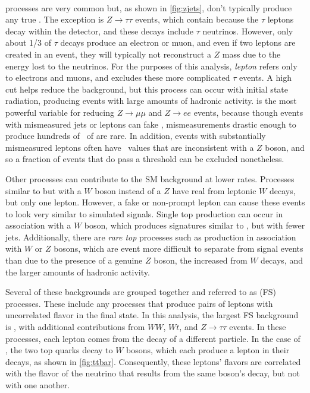 \paragraph{\dyjets} processes are very common but, as shown in \autoref{fig:zjets}, don't typically produce any true \MET. The exception is $Z\rightarrow\tau\tau$ events, which contain \MET because the $\tau$ leptons decay within the detector, and these decays include $\tau$ neutrinos. However, only about 1/3 of $\tau$ decays produce an electron or muon, and even if two leptons are created in an event, they will typically not reconstruct a $Z$ mass due to the energy lost to the neutrinos. For the purposes of this analysis, \textit{lepton} refers only to electrons and muons, and excludes these more complicated $\tau$ events. A high \HT cut helps reduce the \dyjets background, but this process can occur with initial state radiation, producing events with large amounts of hadronic activity. \MET is the most powerful variable for reducing $Z\rightarrow\mu\mu$ and $Z\rightarrow ee$ events, because though events with mismeasured jets or leptons can fake \MET, mismeasurements drastic enough to produce hundreds of \gev~of \met are rare. In addition, events with substantially mismeasured leptons often have \mll~values that are inconsistent with a $Z$ boson, and so a fraction of \dyjets events that do pass a \MET threshold can be excluded nonetheless. 

Other processes can contribute to the \ac{SM} background at lower rates. Processes similar to \dyjets but with a $W$ boson instead of a $Z$ have real \MET from leptonic $W$ decays, but only one lepton. However, a fake or non-prompt lepton can cause these events to look very similar to simulated signals. Single top production can occur in association with a $W$ boson, which produces signatures similar to \ttbar, but with fewer jets.  Additionally, there are \textit{rare top} processes such as \ttbar production in association with $W$ or $Z$ bosons, which are event more difficult to separate from signal events than \ttbar due to the presence of a genuine $Z$ boson, the increased \met from $W$ decays, and the larger amounts of hadronic activity.

Several of these backgrounds are grouped together and referred to as \textit{} (\acs{FS}) processes. These include any processes that produce pairs of leptons with uncorrelated flavor in the final state. In this analysis, the largest \ac{FS} background is \ttbar, with additional contributions from $WW$, $Wt$, and $Z\rightarrow\tau\tau$ events. In these processes, each lepton comes from the decay of a different particle. In the case of \ttbar, the two top quarks decay to $W$ bosons, which each produce a lepton in their decays, as shown in \autoref{fig:ttbar}. Consequently, these leptons' flavors are correlated with the flavor of the neutrino that results from the same boson's decay, but not with one another.

